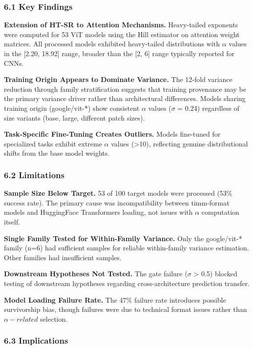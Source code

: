 
\subsubsection{6.1 Key Findings}

\textbf{Extension of HT-SR to Attention Mechanisms.} Heavy-tailed exponents were computed for 53 ViT models using the Hill estimator on attention weight matrices. All processed models exhibited heavy-tailed distributions with $\alpha$ values in the [2.20, 18.92] range, broader than the [2, 6] range typically reported for CNNs.

\textbf{Training Origin Appears to Dominate Variance.} The 12-fold variance reduction through family stratification suggests that training provenance may be the primary variance driver rather than architectural differences. Models sharing training origin (google/vit-*) show consistent $\alpha$ values ($\sigma$ = 0.24) regardless of size variants (base, large, different patch sizes).

\textbf{Task-Specific Fine-Tuning Creates Outliers.} Models fine-tuned for specialized tasks exhibit extreme $\alpha$ values (>10), reflecting genuine distributional shifts from the base model weights.

\subsubsection{6.2 Limitations}

\textbf{Sample Size Below Target.} 53 of 100 target models were processed (53\% success rate). The primary cause was incompatibility between timm-format models and HuggingFace Transformers loading, not issues with $\alpha$ computation itself.

\textbf{Single Family Tested for Within-Family Variance.} Only the google/vit-* family (n=6) had sufficient samples for reliable within-family variance estimation. Other families had insufficient samples.

\textbf{Downstream Hypotheses Not Tested.} The gate failure ($\sigma$ > 0.5) blocked testing of downstream hypotheses regarding cross-architecture prediction transfer.

\textbf{Model Loading Failure Rate.} The 47\% failure rate introduces possible survivorship bias, though failures were due to technical format issues rather than $\alpha -related$ selection.

\subsubsection{6.3 Implications}

